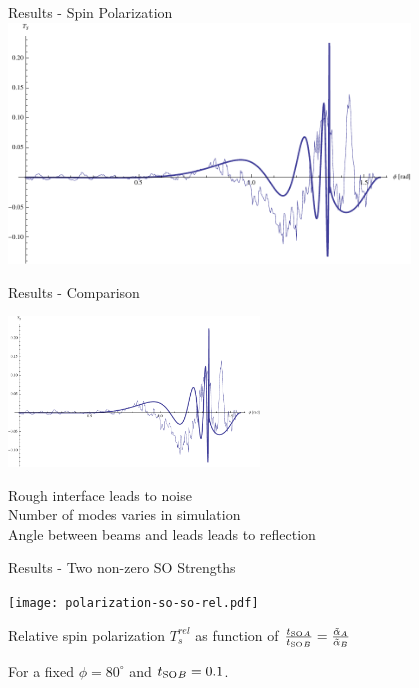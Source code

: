 \documentclass{beamer}
\newcommand{\ta}{\ensuremath{\tilde\alpha}}
\newcommand{\tso}{\ensuremath{t_{\textnormal{SO}}}}
\begin{document}
\begin{frame}{Results - Spin Polarization}
    \includegraphics[width=0.8\textwidth]{comparison-over-phi.pdf}
\end{frame}

\begin{frame}{Results - Comparison}
    \begin{multicols}{2}
    \includegraphics[width=0.5\textwidth]{comparison-over-phi.pdf}

    Rough interface leads to noise\\[1em]

    Number of modes varies in simulation\\[1em]

    Angle between beams and leads leads to reflection

    \end{multicols}
\end{frame}

\begin{frame}{Results - Two non-zero SO Strengths}
    \begin{center}
        \texttt{[image: polarization-so-so-rel.pdf]}

   Relative spin polarization $T_s^{rel}$ as function of
        $ \frac{\tso{}_A}{\tso{}_B} =\frac{\ta_A}{\ta_B}$

        For a fixed $\phi=80^\circ$ and $\tso{}_B = 0.1$.

    \end{center}
\end{frame}
\end{document}
